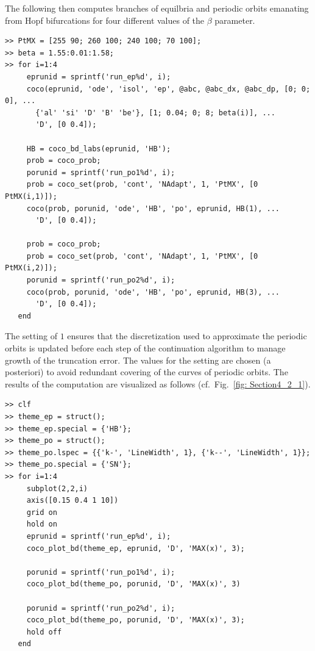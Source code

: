 The following then computes branches of equilbria and periodic orbits emanating from Hopf bifurcations for four different values of the $\beta$ parameter.
\begin{lstlisting}[language=coco-highlight,frame=lines]
>> PtMX = [255 90; 260 100; 240 100; 70 100];
>> beta = 1.55:0.01:1.58;
>> for i=1:4
     eprunid = sprintf('run_ep%d', i);
     coco(eprunid, 'ode', 'isol', 'ep', @abc, @abc_dx, @abc_dp, [0; 0; 0], ...
       {'al' 'si' 'D' 'B' 'be'}, [1; 0.04; 0; 8; beta(i)], ...
       'D', [0 0.4]);
  
     HB = coco_bd_labs(eprunid, 'HB');
     prob = coco_prob;
     porunid = sprintf('run_po1%d', i);
     prob = coco_set(prob, 'cont', 'NAdapt', 1, 'PtMX', [0 PtMX(i,1)]);
     coco(prob, porunid, 'ode', 'HB', 'po', eprunid, HB(1), ...
       'D', [0 0.4]);
       
     prob = coco_prob;
     prob = coco_set(prob, 'cont', 'NAdapt', 1, 'PtMX', [0 PtMX(i,2)]);
     porunid = sprintf('run_po2%d', i);
     coco(prob, porunid, 'ode', 'HB', 'po', eprunid, HB(3), ...
       'D', [0 0.4]);
   end
\end{lstlisting}
The  setting of $1$ ensures that the discretization used to approximate the periodic orbits is updated before each step of the continuation algorithm to manage growth of the truncation error. The values for the  setting are chosen (a posteriori) to avoid redundant covering of the curves of periodic orbits. The results of the computation are visualized as follows (cf.\ Fig.~\ref{fig: Section4_2_1}).
\begin{lstlisting}[language=coco-highlight,frame=lines]
>> clf
>> theme_ep = struct();
>> theme_ep.special = {'HB'};
>> theme_po = struct();
>> theme_po.lspec = {{'k-', 'LineWidth', 1}, {'k--', 'LineWidth', 1}};
>> theme_po.special = {'SN'};
>> for i=1:4
     subplot(2,2,i)
     axis([0.15 0.4 1 10])
     grid on
     hold on
     eprunid = sprintf('run_ep%d', i);
     coco_plot_bd(theme_ep, eprunid, 'D', 'MAX(x)', 3);

     porunid = sprintf('run_po1%d', i);
     coco_plot_bd(theme_po, porunid, 'D', 'MAX(x)', 3)
  
     porunid = sprintf('run_po2%d', i);
     coco_plot_bd(theme_po, porunid, 'D', 'MAX(x)', 3);
     hold off
   end
\end{lstlisting}
